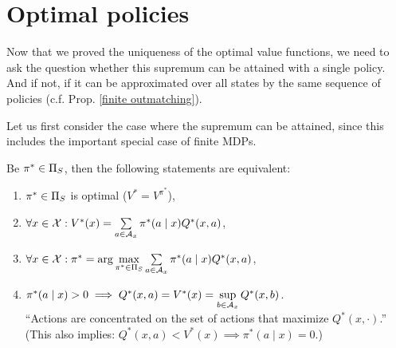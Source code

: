 \section{Optimal policies}
Now that we proved the uniqueness of the optimal value functions, we need to ask the question whether this supremum can be attained with a single policy. And if not, if it can be approximated over all states by the same sequence of policies (c.f. Prop. \ref{finite outmatching}). 

Let us first consider the case where the supremum can be attained, since this includes the important special case of finite MDPs.  

\begin{prop}\label{sup is attained}Be \(\pi^*\in\Pi_S\), then the following statements are equivalent:
\begin{enumerate}[label={(\roman*)},font=\normalfont]
\item \label{ii:1}\(\pi^* \in\Pi_S\) is optimal (\(V^*=V^{\pi^*}\)),
\item \label{ii:2} \(\forall x\in\mathcal{X}: V^*(x)=\sum\limits_{a\in\mathcal{A}_x}\pi^*(a\mid x)Q^*(x,a)\),
\item\label{ii:3} \(\forall x\in\mathcal{X}: \pi^*=\arg\max\limits_{\pi^*\in\Pi_S}\sum\limits_{a\in\mathcal{A}_x}\pi^*(a\mid x)Q^*(x,a) \),
\item\label{ii:4} \(\pi^*(a\mid x)>0 \implies Q^*(x,a)=V^*(x) =\sup\limits_{b\in\mathcal{A}_x}Q^*(x,b)\). \\
	``Actions are concentrated on the set of actions that maximize \(Q^*(x,\cdot)\).''\\
	(This also implies: \(Q^*(x,a)<V^*(x) \implies \pi^*(a\mid x)=0\).)
\end{enumerate}
\end{prop}

